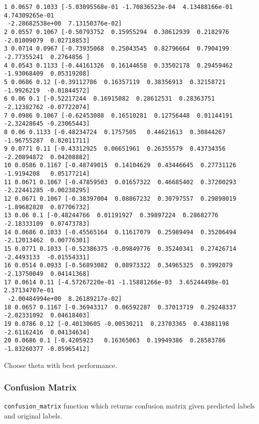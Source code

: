 \documentclass[11pt]{article}
\begin{document}
    \begin{Verbatim}[commandchars=\\\{\}]
1 0.0657 0.1033 [-5.03095568e-01 -1.70836523e-04  4.13488166e-01  4.74309265e-01
 -2.28682538e+00  7.13150376e-02]
2 0.0557 0.1067 [-0.50793752  0.15955294  0.38612939  0.2182976  -2.01009079  0.02718853]
3 0.0714 0.0967 [-0.73935068  0.25043545  0.82796664  0.7904199  -2.77355241  0.2764856 ]
4 0.0543 0.1133 [-0.44161326  0.16144658  0.33502178  0.29459462 -1.93068409  0.05319208]
5 0.0686 0.12 [-0.39112786  0.16357119  0.38356913  0.32158721 -1.9926219  -0.01844572]
6 0.06 0.1 [-0.52217244  0.16915082  0.28612531  0.28363751 -2.12382762 -0.07722074]
7 0.0986 0.1067 [-0.62453088  0.16510281  0.12756448  0.01144191 -2.32428645 -0.23065443]
8 0.06 0.1133 [-0.48234724  0.1757505   0.44621613  0.30844267 -1.96755287  0.02011711]
9 0.0771 0.11 [-0.43312925  0.06651961  0.26355579  0.43734356 -2.20894872  0.04208882]
10 0.0586 0.1167 [-0.48749015  0.14104629  0.43446645  0.27731126 -1.9194208   0.05177214]
11 0.0671 0.1067 [-0.47859503  0.01657322  0.46685402  0.37200293 -2.22441285 -0.00238295]
12 0.0671 0.1067 [-0.38397004  0.08867232  0.30797557  0.29898019 -1.89682828  0.07706732]
13 0.06 0.1 [-0.48244766  0.01191927  0.39897224  0.28682776 -2.18333109  0.07473783]
14 0.0686 0.1033 [-0.45565164  0.11617079  0.25989494  0.35206494 -2.12013462  0.00776301]
15 0.0771 0.1033 [-0.52386375 -0.09849776  0.35240341  0.27426714 -2.4493133  -0.01554331]
16 0.0514 0.0933 [-0.56893082  0.08973322  0.34965325  0.3992079  -2.13750049  0.04141368]
17 0.0614 0.11 [-4.57267220e-01 -1.15881266e-03  3.65244498e-01  2.37134707e-01
 -2.00484994e+00  8.26189217e-02]
18 0.0657 0.1167 [-0.36943317  0.06592287  0.37013719  0.29248337 -2.02331092  0.04618403]
19 0.0786 0.12 [-0.40130605 -0.00530211  0.23703365  0.43881198 -2.61162416  0.04134634]
20 0.0686 0.1 [-0.4205923   0.16365063  0.19949386  0.28583786 -1.83260377 -0.05965412]

    \end{Verbatim}

    Choose theta with best performance.

    \hypertarget{confusion-matrix}{%
\subsubsection{Confusion Matrix}\label{confusion-matrix}}

    \texttt{confusion\_matrix} function which returns confusion matrix given
predicted labels and original labels.
\end{document}
